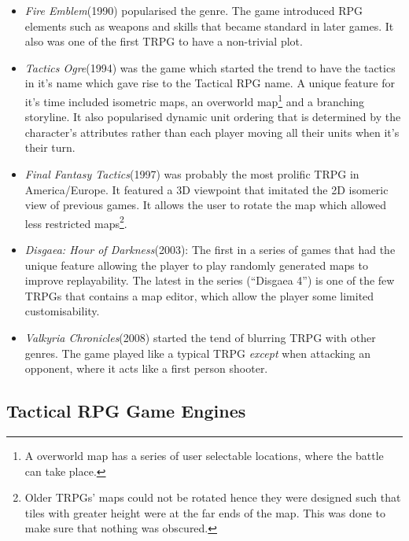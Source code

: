 \begin{itemize}
	
	\item \emph{Fire Emblem}(1990) popularised the genre. The game introduced RPG elements such as weapons and skills that became standard in later games. It also was one of the first TRPG to have a non-trivial plot. 

	\item \emph{Tactics Ogre}(1994) was the game which started the trend to have the tactics in it's name  which gave rise to the Tactical RPG name\footnotemark[\value{footnote}]\cite{tactics}. A unique feature for it's time included isometric maps, an overworld map\footnote{A overworld map has a series of user selectable locations, where the battle can take place.} and  a branching storyline. It also popularised dynamic unit ordering that is determined by the character's attributes rather than each player moving all their units when it's their turn.

	\item \emph{Final Fantasy Tactics}(1997) was probably the most prolific TRPG in America/Europe. It featured a 3D viewpoint that imitated  the 2D isomeric view of previous games.  It allows the user to rotate the map which allowed less restricted maps\footnote{Older TRPGs' maps could not be rotated hence they were designed such that tiles with greater height were at the far ends of the map. This was done to make sure that nothing was obscured.}.
	
	\item  \emph{Disgaea: Hour of Darkness}(2003): The first in a series of games that had the unique feature allowing the player to play randomly generated maps to improve replayability. The latest in the series (``Disgaea 4'') is one of the few TRPGs that contains a map editor, which allow the player some limited customisability. 


	\item  \emph{Valkyria Chronicles}(2008) started the tend of blurring TRPG with other genres. The game played like a typical TRPG \emph{except} when attacking an opponent, where it acts like a first person shooter.

\end{itemize}


\subsection{Tactical RPG Game Engines}
\label{sub:tactical_rpg_game_engines}

